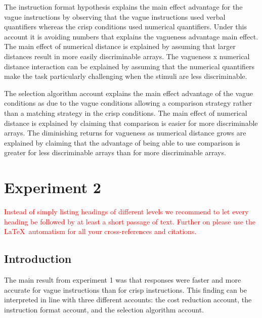 \documentclass[graybox,envcountchap,sectrefs%
,footinfo
]{svmono}
\begin{document}
The instruction format hypothesis explains the main effect advantage for the vague instructions by observing that the vague instructions used verbal quantifiers whereas the crisp conditions used numerical quantifiers. Under this account it is avoiding numbers that explains the vagueness advantage main effect. The main effect of numerical distance is explained by assuming that larger distances result in more easily discriminable arrays. The vagueness x numerical distance interaction can be explained by assuming that the numerical quantifiers make the task particularly challenging when the stimuli are less discriminable.

The selection algorithm account explains the main effect advantage of the vague conditions as due to the vague conditions allowing a comparison strategy rather than a matching strategy in the crisp conditions. The main effect of numerical distance is explained by claiming that comparison is easier for more discriminable arrays. The diminishing returns for vagueness as numerical distance grows are explained by claiming that the advantage of being able to use comparison is greater for less discriminable arrays than for more discriminable arrays.


\section{Experiment 2}
\label{sec:3}
\textcolor{red}{Instead of simply listing headings of different levels we recommend to let every heading be followed by at least a short passage of text. Further on please use the \LaTeX\ automatism for all your cross-references and citations.}


\subsection{Introduction}

The main result from experiment 1 was that responses were faster and more accurate for vague instructions than for crisp instructions. This finding can be interpreted in line with three different accounts: the cost reduction account, the instruction format account, and the selection algorithm account. 
\end{document}
